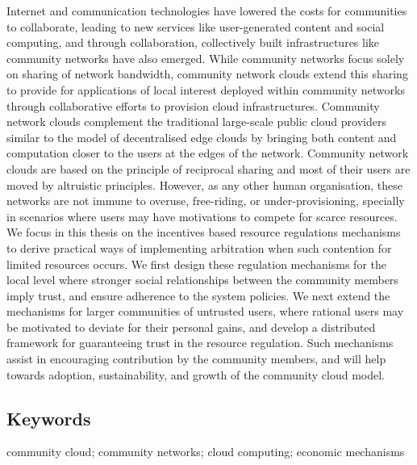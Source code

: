 
Internet and communication technologies have lowered the costs for communities to collaborate, leading to new services like user-generated content and social computing, and through collaboration, collectively built infrastructures like community networks have also emerged. 
While community networks focus solely on sharing of network bandwidth,
community network clouds extend this sharing to provide for applications of local interest deployed within community networks through collaborative efforts to provision cloud infrastructures.
Community network clouds complement the traditional large-scale public cloud providers similar to the model of decentralised edge clouds by bringing both content and computation closer to the users at the edges of the network. 
Community network clouds are based on the principle of reciprocal sharing and most of their users are moved by altruistic principles. 
However, as any other human organisation, these networks are not immune to overuse, free-riding, or under-provisioning, specially in scenarios where users may have motivations to compete for scarce resources.
We focus in this thesis on the incentives based resource regulations mechanisms to derive practical ways of implementing arbitration when such contention for limited resources occurs.
We first design these regulation mechanisms for the local level where stronger social relationships between the community members imply trust, and ensure adherence to the system policies.
We next extend the mechanisms for larger communities of untrusted users, where rational users may be motivated to deviate for their personal gains, and develop a distributed framework for guaranteeing trust in the resource regulation.
Such mechanisms assist in encouraging contribution by the community members, and will help towards adoption, sustainability, and growth of the community cloud model.

\vfill

\subsection*{Keywords} 
		community cloud;
		community networks; 
		cloud computing; 
		economic mechanisms
